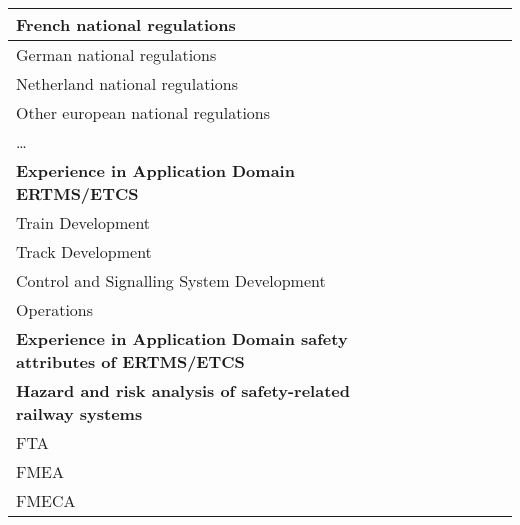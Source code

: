 \documentclass[a4paper, 11pt]{article}
\begin{document}
\begin{center}
\begin{longtable}{|r|r|r|r|r|r|r|r|}
    \multicolumn{1}{|l|}{French national regulations} & \multicolumn{1}{c|}{} &       &       &       &       &       &  \bigstrut[b]\\
    \hline
    \multicolumn{1}{|l|}{German national regulations} & \multicolumn{1}{c|}{} &       &       &       &       &       &  \bigstrut\\
    \hline
    \multicolumn{1}{|l|}{Netherland national regulations} & \multicolumn{1}{c|}{} &       &       &       &       &       &  \bigstrut\\
    \hline
    \multicolumn{1}{|l|}{Other european national regulations} & \multicolumn{1}{c|}{} &       &       &       &       &       &  \bigstrut\\
    \hline
    \multicolumn{1}{|l|}{…} & \multicolumn{1}{c|}{} &       &       &       &       &       &  \bigstrut[t]\\
    \multicolumn{1}{|l|}{\textbf{Experience in Application Domain ERTMS/ETCS}} & \multicolumn{1}{c|}{\textbf{}} &       &       &       &       &       &  \\
    \multicolumn{1}{|l|}{Train Development} & \multicolumn{1}{c|}{} &       &       &       &       &       &  \bigstrut[b]\\
    \hline
    \multicolumn{1}{|l|}{Track Development} & \multicolumn{1}{c|}{} &       &       &       &       &       &  \bigstrut\\
    \hline
    \multicolumn{1}{|l|}{Control and Signalling System Development} & \multicolumn{1}{c|}{} &       &       &       &       &       &  \bigstrut\\
    \hline
    \multicolumn{1}{|l|}{Operations} & \multicolumn{1}{c|}{} &       &       &       &       &       &  \bigstrut[t]\\
    \multicolumn{1}{|l|}{\textbf{Experience in Application Domain safety attributes of ERTMS/ETCS}} & \multicolumn{1}{c|}{\textbf{}} &       &       &       &       &       &  \\
    \multicolumn{1}{|l|}{\textbf{Hazard and risk analysis of safety-related railway systems}} & \multicolumn{1}{c|}{\textbf{}} &       &       &       &       &       &  \\
    \multicolumn{1}{|l|}{FTA } & \multicolumn{1}{c|}{} &       &       &       &       &       &  \bigstrut[b]\\
    \hline
    \multicolumn{1}{|l|}{FMEA} & \multicolumn{1}{c|}{} &       &       &       &       &       &  \bigstrut\\
    \hline
    \multicolumn{1}{|l|}{FMECA} & \multicolumn{1}{c|}{} &       &       &       &       &       &  \bigstrut\\

\end{longtable}
\end{center}
\end{document}
